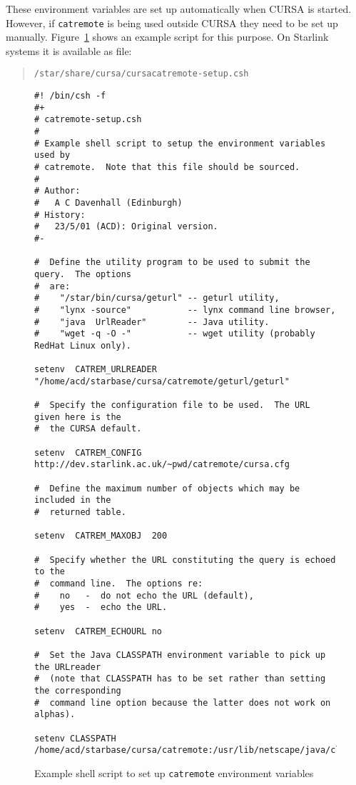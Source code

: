 \documentclass[twoside,11pt]{article}
\newcommand{\latex}[1]{#1}
\renewcommand{\_}{\texttt{\symbol{95}}}
\begin{document}
These environment variables are set up automatically when CURSA is started.
However, if {\tt catremote} is being used outside CURSA they need to be
set up manually.
Figure~\ref{SETENVAR} shows an example script for this purpose.  On
Starlink systems it is available as file:

\begin{quote}
{\tt /star/share/cursa/cursacatremote-setup.csh}
\end{quote}

\begin{figure}[htbp]
\latex{\begin{small}}
\begin{verbatim}
#! /bin/csh -f
#+
# catremote-setup.csh
#
# Example shell script to setup the environment variables used by
# catremote.  Note that this file should be sourced.
#
# Author:
#   A C Davenhall (Edinburgh)
# History:
#   23/5/01 (ACD): Original version.
#-

#  Define the utility program to be used to submit the query.  The options
#  are:
#    "/star/bin/cursa/geturl" -- geturl utility,
#    "lynx -source"           -- lynx command line browser,
#    "java  UrlReader"        -- Java utility.
#    "wget -q -O -"           -- wget utility (probably RedHat Linux only).

setenv  CATREM_URLREADER "/home/acd/starbase/cursa/catremote/geturl/geturl"

#  Specify the configuration file to be used.  The URL given here is the
#  the CURSA default.

setenv  CATREM_CONFIG  http://dev.starlink.ac.uk/~pwd/catremote/cursa.cfg

#  Define the maximum number of objects which may be included in the
#  returned table.

setenv  CATREM_MAXOBJ  200

#  Specify whether the URL constituting the query is echoed to the
#  command line.  The options re:
#    no   -  do not echo the URL (default),
#    yes  -  echo the URL.

setenv  CATREM_ECHOURL no

#  Set the Java CLASSPATH environment variable to pick up the URLreader
#  (note that CLASSPATH has to be set rather than setting the corresponding
#  command line option because the latter does not work on alphas).

setenv CLASSPATH /home/acd/starbase/cursa/catremote:/usr/lib/netscape/java/classes
\end{verbatim}
\latex{\end{small}}

\begin{quote}
\caption{Example shell script to set up {\tt catremote} environment
variables  \label{SETENVAR} }
\end{quote}

\end{figure}
\end{document}
